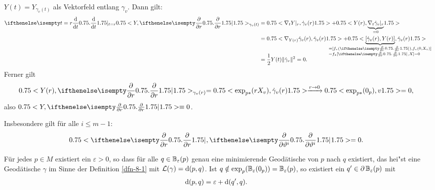 \begin{bew}
$Y(t) = Y_{\gamma_v(t)}$ als Vektorfeld entlang $\gamma_v$.
Dann gilt:
\begin{align*}
	\difffrac[t=r]{}{t} \left<Y,\pdifffrac{}{r}\right>_{\gamma_v(t)} & = \left<\nabla_tY|_r, \dot \gamma_v(r)\right> + \left<Y(r), \smash{\underbrace{\nabla_t\dot\gamma_v|_r}_{=0}}\right> \vphantom{\underbrace{\gamma_v}_{0}}\\
	& = \left<\nabla_{Y(r)}\dot\gamma_v(r), \dot \gamma_v(r)\right> + \left< \smash{\underbrace{[\dot\gamma_v(r),Y(r)]}_{\mathclap{\begin{subarray}{l}= [f_{*}(\pdifffrac{}{r}),f_{*}(0,X_v)]\\ = f_{*}[\pdifffrac{}{r},X] = 0\end{subarray}}}}, \dot \gamma_v(r) \vphantom{\nabla_{Y(r)}} \right>  \vphantom{\underbrace{\gamma_v(r)}_{\pdifffrac{}{r}} }\\
	&= \frac{1}{2}Y(t) \|\dot\gamma_v\|^2 = 0.
\end{align*}
Ferner gilt
\begin{align*}
	\left<Y(r),\pdifffrac{}{r}\right>_{\gamma_v(r)} = \left<\exp_{p*}(rX_v),\dot\gamma_v(r)\right> \xrightarrow{r \to 0}\left<\exp_{p*}(0_p),v\right> = 0,
\end{align*}
also $\left<Y,\pdifffrac{}{r}\right> \equiv 0$.
\end{bew}

\begin{bem}
  Insbesondere gilt für alle $i \leq m-1$:
  \begin{align*}
    \left<\pdifffrac{}{r}, \pdifffrac{}{\vartheta^i}\right> = 0.
  \end{align*}
\end{bem}

\begin{Satz}
Für jedes $p \in M$ existiert ein $\varepsilon > 0$, so dass für alle $q \in \operatorname{\mathbb{B}}_{\varepsilon}(p)$ genau eine minimierende Geodätische von $p$ nach $q$ existiert, das hei"st eine Geodätische $\gamma$ im Sinne der Definition \ref{dfn-8-1} mit $\mathcal L(\gamma) = \mathrm{d}(p,q)$.
Ist $q \notin \exp_p(\operatorname{\mathbb{B}}_{\varepsilon}(0_p)) = \operatorname{\mathbb{B}}_{\varepsilon}(p)$, so existiert ein $q' \in \partial \operatorname{\mathbb{B}}_{\varepsilon}(p)$ mit
\begin{align*}
	\mathrm{d}(p,q) = \varepsilon + \mathrm{d}(q',q).
\end{align*}
\end{Satz}

